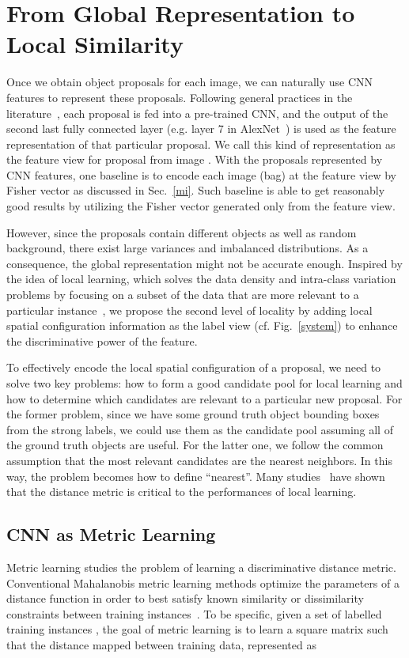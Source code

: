 \documentclass[10pt,twocolumn,letterpaper]{article}
\begin{document}
\section{From Global Representation to Local Similarity}
\label{lv} Once we obtain object proposals for each image, we can
naturally use CNN features to represent these proposals. Following
general practices in the literature~\cite{Sermanet2013,Razavian2014}, each proposal is fed
into a pre-trained CNN, and the output of the second last fully
connected layer (e.g. layer 7 in AlexNet~\cite{Alex2012}) is used
as the feature representation of that particular proposal. We call
this kind of representation as the feature view  for
proposal  from image . With the proposals
represented by CNN features, one baseline is to encode each image
(bag) at the feature view by Fisher vector as discussed in
Sec.~\ref{mi}. Such baseline is able to get reasonably good
results by utilizing the Fisher vector generated only from the
feature view.

However, since the proposals contain different objects as well as
random background, there exist large variances and imbalanced
distributions. As a consequence, the global representation might
not be accurate enough. Inspired by the idea of local learning,
which solves the data density and intra-class variation problems
by focusing on a subset of the data that are more relevant to a
particular instance~\cite{Bottou1992}, we propose the second level
of locality by adding local spatial configuration information as
the label view (cf. Fig.~\ref{system}) to enhance the
discriminative power of the feature.

To effectively encode the local spatial configuration of a
proposal, we need to solve two key problems: how to form a good
candidate pool for local learning and how to determine which
candidates are relevant to a particular new proposal. For the
former problem, since we have some ground truth object bounding
boxes from the strong labels, we could use them as the candidate
pool assuming all of the ground truth objects are useful. For the
latter one, we follow the common assumption that the most relevant
candidates are the nearest neighbors. In this way, the problem
becomes how to define ``nearest''.  Many
studies~\cite{Bellet2013,Weinberger2009} have shown that the
distance metric is critical to the performances of local learning.

\subsection{CNN as Metric Learning}
\label{largeNN} Metric learning studies the problem of learning a
discriminative distance metric. Conventional Mahalanobis metric
learning methods optimize the parameters of a distance function in
order to best satisfy known similarity or dissimilarity
constraints between training instances~\cite{Bellet2013}. To be
specific, given a set of  labelled training instances
, the goal of metric learning is to
learn a square matrix  such that the distance mapped
between training data, represented as
\end{document}
